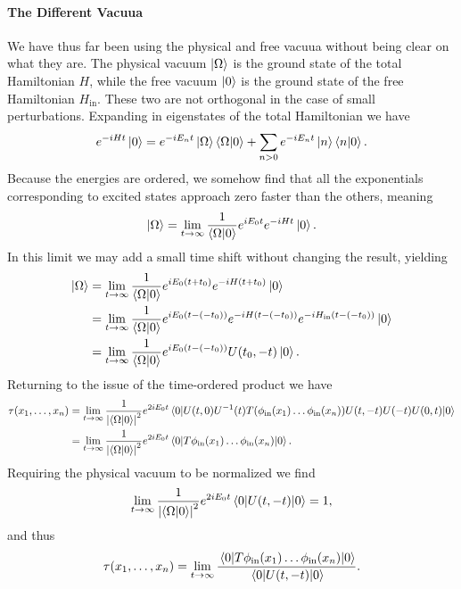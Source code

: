 \paragraph{The Different Vacuua}
We have thus far been using the physical and free vacuua without being clear on what they are. The physical vacuum $\ket{\Omega}$ is the ground state of the total Hamiltonian $H$, while the free vacuum $\ket{0}$ is the ground state of the free Hamiltonian $H_{\text{in}}$. These two are not orthogonal in the case of small perturbations. Expanding in eigenstates of the total Hamiltonian we have
\begin{align*}
	e^{-iHt}\ket{0} = e^{-iE_{n}t}\ket{\Omega}\braket{\Omega}{0} + \sum\limits_{n > 0}e^{-iE_{n}t}\ket{n}\braket{n}{0}.
\end{align*}
Because the energies are ordered, we somehow find that all the exponentials corresponding to excited states approach zero faster than the others, meaning
\begin{align*}
	\ket{\Omega} = \lim\limits_{t\to\infty}\frac{1}{\braket{\Omega}{0}}e^{iE_{0}t}e^{-iHt}\ket{0}.
\end{align*}
In this limit we may add a small time shift without changing the result, yielding
\begin{align*}
	\ket{\Omega} &= \lim\limits_{t\to\infty}\frac{1}{\braket{\Omega}{0}}e^{iE_{0}(t + t_{0})}e^{-iH(t + t_{0})}\ket{0} \\
	             &= \lim\limits_{t\to\infty}\frac{1}{\braket{\Omega}{0}}e^{iE_{0}(t - (-t_{0}))}e^{-iH(t - (-t_{0}))}e^{-iH_{\text{in}}(t - (-t_{0}))}\ket{0} \\
	             &= \lim\limits_{t\to\infty}\frac{1}{\braket{\Omega}{0}}e^{iE_{0}(t - (-t_{0}))}U(t_{0}, -t)\ket{0}.
\end{align*}
Returning to the issue of the time-ordered product we have
\begin{align*}
	\tau(x_{1}, \dots, x_{n}) &= \lim\limits_{t\to\infty}\frac{1}{\abs{\braket{\Omega}{0}}^{2}}e^{2iE_{0}t}\expval{U(t, 0)U^{-1}(t)\ensuremath{T}(\phi_{\text{in}}(x_{1})\dots\phi_{\text{in}}(x_{n}))U(t, -t)U(-t)U(0, t)}{0} \\
	                          &= \lim\limits_{t\to\infty}\frac{1}{\abs{\braket{\Omega}{0}}^{2}}e^{2iE_{0}t}\expval{\ensuremath{T}\phi_{\text{in}}(x_{1})\dots\phi_{\text{in}}(x_{n})}{0}.
\end{align*}
Requiring the physical vacuum to be normalized we find
\begin{align*}
	\lim\limits_{t\to\infty}\frac{1}{\abs{\braket{\Omega}{0}}^{2}}e^{2iE_{0}t}\expval{U(t, -t)}{0} = 1,
\end{align*}
and thus
\begin{align*}
	\tau(x_{1}, \dots, x_{n}) = \lim\limits_{t\to\infty}\frac{\expval{\ensuremath{T}\phi_{\text{in}}(x_{1})\dots\phi_{\text{in}}(x_{n})}{0}}{\expval{U(t, -t)}{0}}.
\end{align*}

